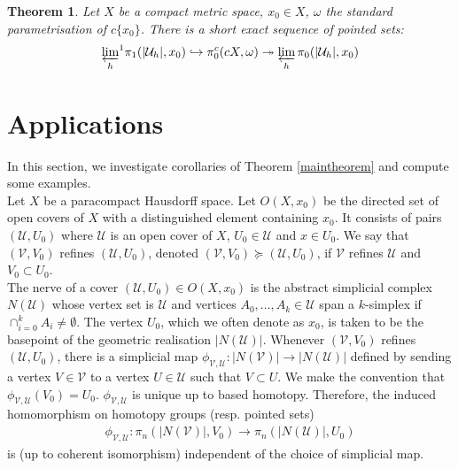 \documentclass[a4paper,11pt]{article}
\theoremstyle{definition}
\theoremstyle{plain}
\newtheorem{theorem}[definition]{Theorem}
\theoremstyle{remark}
\begin{document}
{\begin{theorem} \label{maintheorem2} Let $X$ be a compact metric space, $x_0\in X$, $\omega$ the standard parametrisation of $c\{x_0\}$. There is a short exact sequence of pointed sets:
\begin{align*}
 {\varprojlim_h}^1  \pi_{1}(|\mathcal{U}_{h}|,x_0) \hookrightarrow  \pi^{c}_{0}(cX,\omega) \twoheadrightarrow \varprojlim_{h} \pi_0 (|\mathcal{U}_{h}|,x_0) 
\end{align*}
\end{theorem}
 
\newpage
\section{Applications}

In this section, we investigate corollaries of Theorem \ref{maintheorem} and compute some examples.\\

Let $X$ be a paracompact Hausdorff space. Let $O(X,x_{0})$ be the directed set of open covers of $X$ with a distinguished element containing $x_{0}$. It consists of pairs $(\mathcal{U},U_{0})$ where $\mathcal{U}$ is an open cover of $X$, $U_{0}\in \mathcal{U}$ and $x\in U_{0}$. We say that $(\mathcal{V}, V_{0})$ refines $(\mathcal{U},U_{0})$, denoted $(\mathcal{V}, V_{0}) \succeq (\mathcal{U},U_{0})$, if $\mathcal{V}$ refines $\mathcal{U}$ and $V_{0} \subset U_{0}$. \\

The nerve of a cover $(\mathcal{U}, U_{0})\in O(X,x_{0})$ is the abstract simplicial complex $N(\mathcal{U})$ whose vertex set is $\mathcal{U}$ and vertices $A_{0}, \dots, A_{k}\in \mathcal{U}$ span a $k$-simplex if $\cap_{i=0}^{k} A_{i}\neq \emptyset$. The vertex $U_{0}$, which we often denote as $x_{0}$, is taken to be the basepoint of the geometric realisation $|N(\mathcal{U})|$. Whenever $(\mathcal{V}, V_{0})$ refines $(\mathcal{U},U_{0})$, there is a simplicial map $\phi_{\mathcal{V},\mathcal{U}}: |N(\mathcal{V})|\rightarrow |N(\mathcal{U})|$ defined by sending a vertex $V\in \mathcal{V}$ to a vertex $U\in \mathcal{U}$ such that $V\subset U$. We make the convention that $\phi_{\mathcal{V},\mathcal{U}}(V_{0}) = U_{0}$. $\phi_{\mathcal{V},\mathcal{U}}$ is unique up to based homotopy. Therefore, the induced homomorphism on homotopy groups (resp. pointed sets)
\begin{align*}
\phi_{\mathcal{V},\mathcal{U}}: \pi_{n}(|N(\mathcal{V})|,V_{0}) \rightarrow \pi_{n}(|N(\mathcal{U})|,U_{0})
\end{align*}
is (up to coherent isomorphism) independent of the choice of simplicial map. 


}
\end{document}
